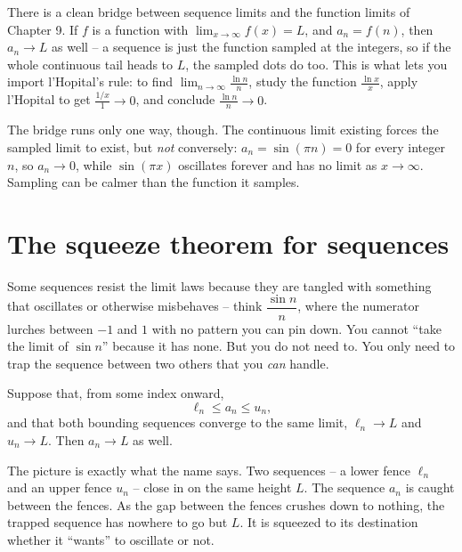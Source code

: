 \begin{connectionbox}
There is a clean bridge between sequence limits and the function limits of
Chapter 9. If $f$ is a function with $\lim_{x\to\infty} f(x) = L$, and $a_n =
f(n)$, then $a_n \to L$ as well -- a sequence is just the function sampled at the
integers, so if the whole continuous tail heads to $L$, the sampled dots do too.
This is what lets you import l'Hopital's rule: to find $\lim_{n\to\infty}
\tfrac{\ln n}{n}$, study the function $\tfrac{\ln x}{x}$, apply l'Hopital to get
$\tfrac{1/x}{1} \to 0$, and conclude $\tfrac{\ln n}{n} \to 0$.

The bridge runs only one way, though. The continuous limit existing forces the
sampled limit to exist, but \emph{not} conversely: $a_n = \sin(\pi n) = 0$ for
every integer $n$, so $a_n \to 0$, while $\sin(\pi x)$ oscillates forever and has
no limit as $x \to \infty$. Sampling can be calmer than the function it samples.
\end{connectionbox}

\section{The squeeze theorem for sequences}
\label{ch28:squeeze}

Some sequences resist the limit laws because they are tangled with something
that oscillates or otherwise misbehaves -- think $\dfrac{\sin n}{n}$, where the
numerator lurches between $-1$ and $1$ with no pattern you can pin down. You
cannot ``take the limit of $\sin n$'' because it has none. But you do not need
to. You only need to trap the sequence between two others that you \emph{can}
handle.

\begin{theorem}
\label{ch28:thm-squeeze}
Suppose that, from some index onward,
\[
  \ell_n \le a_n \le u_n,
\]
and that both bounding sequences converge to the same limit, $\ell_n \to L$ and
$u_n \to L$. Then $a_n \to L$ as well.
\end{theorem}

\begin{intuitionbox}
The picture is exactly what the name says. Two sequences -- a lower fence
$\ell_n$ and an upper fence $u_n$ -- close in on the same height $L$. The
sequence $a_n$ is caught between the fences. As the gap between the fences
crushes down to nothing, the trapped sequence has nowhere to go but $L$. It is
squeezed to its destination whether it ``wants'' to oscillate or not.
\end{intuitionbox}

